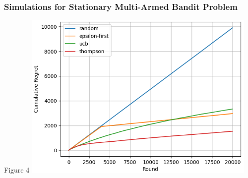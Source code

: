 \documentclass{beamer}
\begin{document}
    \begin{frame}
        \frametitle{Simulations for Stationary Multi-Armed Bandit Problem}
        Figure 4
        \includegraphics[width=0.85\textwidth]{../report/figures/100machines}
    \end{frame}
\end{document}
